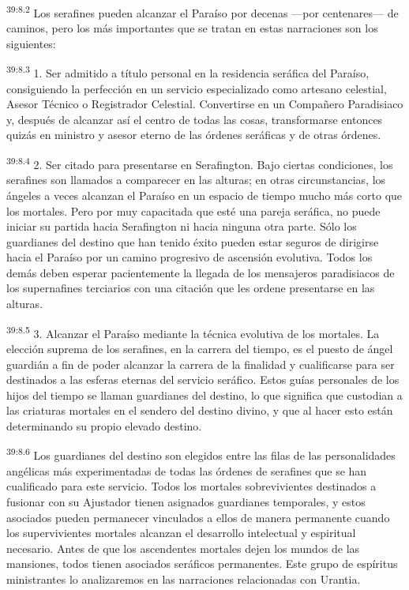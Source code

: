\par
\textsuperscript{39:8.2} Los serafines pueden alcanzar el Paraíso por decenas ---por centenares--- de caminos, pero los más importantes que se tratan en estas narraciones son los siguientes:

\par
\textsuperscript{39:8.3} 1. Ser admitido a título personal en la residencia seráfica del Paraíso, consiguiendo la perfección en un servicio especializado como artesano celestial, Asesor Técnico o Registrador Celestial. Convertirse en un Compañero Paradisiaco y, después de alcanzar así el centro de todas las cosas, transformarse entonces quizás en ministro y asesor eterno de las órdenes seráficas y de otras órdenes.

\par
\textsuperscript{39:8.4} 2. Ser citado para presentarse en Serafington. Bajo ciertas condiciones, los serafines son llamados a comparecer en las alturas; en otras circunstancias, los ángeles a veces alcanzan el Paraíso en un espacio de tiempo mucho más corto que los mortales. Pero por muy capacitada que esté una pareja seráfica, no puede iniciar su partida hacia Serafington ni hacia ninguna otra parte. Sólo los guardianes del destino que han tenido éxito pueden estar seguros de dirigirse hacia el Paraíso por un camino progresivo de ascensión evolutiva. Todos los demás deben esperar pacientemente la llegada de los mensajeros paradisiacos de los supernafines terciarios con una citación que les ordene presentarse en las alturas.

\par
\textsuperscript{39:8.5} 3. Alcanzar el Paraíso mediante la técnica evolutiva de los mortales. La elección suprema de los serafines, en la carrera del tiempo, es el puesto de ángel guardián a fin de poder alcanzar la carrera de la finalidad y cualificarse para ser destinados a las esferas eternas del servicio seráfico. Estos guías personales de los hijos del tiempo se llaman guardianes del destino, lo que significa que custodian a las criaturas mortales en el sendero del destino divino, y que al hacer esto están determinando su propio elevado destino.

\par
\textsuperscript{39:8.6} Los guardianes del destino son elegidos entre las filas de las personalidades angélicas más experimentadas de todas las órdenes de serafines que se han cualificado para este servicio. Todos los mortales sobrevivientes destinados a fusionar con su Ajustador tienen asignados guardianes temporales, y estos asociados pueden permanecer vinculados a ellos de manera permanente cuando los supervivientes mortales alcanzan el desarrollo intelectual y espiritual necesario. Antes de que los ascendentes mortales dejen los mundos de las mansiones, todos tienen asociados seráficos permanentes. Este grupo de espíritus ministrantes lo analizaremos en las narraciones relacionadas con Urantia.

